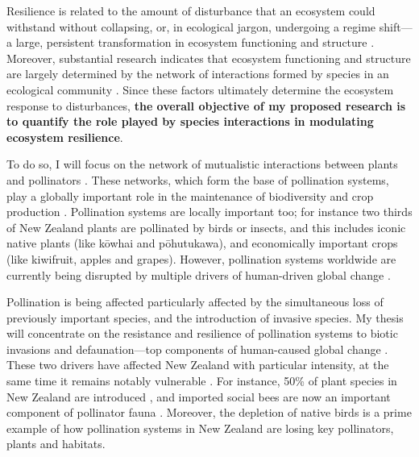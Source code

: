 \documentclass[a4paper]{article}
\begin{document}
Resilience is related to the amount of disturbance that an ecosystem could withstand without collapsing, or, in ecological jargon, undergoing a regime shift---a large, persistent transformation in ecosystem functioning and structure \citep{Holling1973, Gunderson2000}.
Moreover, substantial research indicates that ecosystem functioning and structure are largely determined by the network of interactions formed by species in an ecological community \citep{Bascompte2006, Dobson2006, Tylianakis2008, Reiss2009}.
Since these factors ultimately determine the ecosystem response to disturbances, \textbf{the overall objective of my proposed research is to quantify the role played by species interactions in modulating ecosystem resilience}.

To do so, I will focus on the network of mutualistic interactions between plants and pollinators \citep{Bascompte2006, Bascompte2007, Klein2007}.
These networks, which form the base of pollination systems, play a globally important role in the maintenance of biodiversity and crop production \citep{Bascompte2007, Klein2007}.
Pollination systems are locally important too; for instance two thirds of New Zealand plants are pollinated by birds or insects\citep{Cox2000}, and this includes iconic native plants (like k\={o}whai and p\={o}hutukawa), and economically important crops (like kiwifruit, apples and grapes). However, pollination systems worldwide are currently being disrupted by multiple drivers of human-driven global change \citep{Cox2000}.

Pollination is being affected particularly affected by the simultaneous loss of previously important species, and the introduction of invasive species.
My thesis will concentrate on the resistance and resilience of pollination systems to biotic invasions and defaunation---top components of human-caused global change .
These two drivers have affected New Zealand with particular intensity, at the same time it remains notably vulnerable \citep{Vitousek1997}.
For instance, 50\% of plant species in New Zealand are introduced \citep{Wilton2000}, and imported social bees are now an important component of pollinator fauna \citep{Lloyd1985, Newstrom2005}.
Moreover, the depletion of native birds \citep{Anderson2003, Robertson2009} is a prime example of how pollination systems in New Zealand are losing key pollinators, plants and habitats\citep{Cox2000}.
\end{document}

